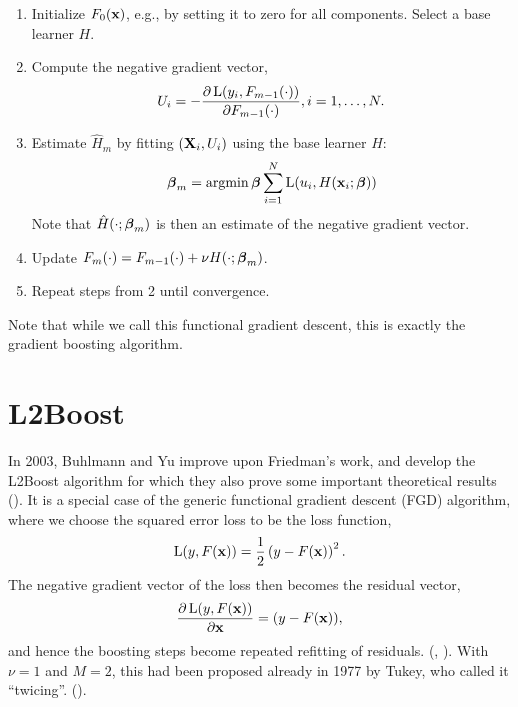 \begin{enumerate}
    \item Initialize $F_0(\mathbf{x})$, e.g., by setting it to zero for all components. Select a base learner $H$.
    \item Compute the negative gradient vector,
        \begin{equation}
            U_i=-\frac{\partial \operatorname{L}(y_i,F_{m-1}(\cdot))}{\partial F_{m-1}(\cdot)}, i=1,\dotsc,N.
        \end{equation}
    \item Estimate $\hat{H}_m$ by fitting $(\mathbf{X}_i,U_i)$ using the base learner $H$:
        \begin{equation}
            \boldsymbol{\beta}_m=\operatorname*{argmin}{\boldsymbol{\beta}}\sum_{i=1}^N\operatorname{L}(u_i,H(\mathbf{x}_i;\boldsymbol{\beta}))
        \end{equation}
        Note that $\hat{H}(\cdot;\boldsymbol{\beta}_m)$ is then an estimate of the negative gradient vector.
    \item Update $F_m(\cdot)=F_{m-1}(\cdot)+\nu H(\cdot;\boldsymbol{\beta}_m)$.
    \item Repeat steps from 2 until convergence.
\end{enumerate}
Note that while we call this functional gradient descent, this is exactly the gradient boosting algorithm.
\section{L2Boost}
In 2003, Buhlmann and Yu improve upon Friedman's work, and develop the L2Boost algorithm for which they also prove some important theoretical results (\cite{buhlmann-yu}). It is a special case of the generic functional gradient descent (FGD) algorithm, where we choose the squared error loss to be the loss function,
\begin{equation}
    \operatorname{L}(y,F(\mathbf{x}))=\frac{1}{2}\left(y-F(\mathbf{x})\right)^2.
\end{equation}
The negative gradient vector of the loss then becomes the residual vector,
\begin{equation}
    \frac{\partial\operatorname{L}(y,F(\mathbf{x}))}{\partial\mathbf{x}}=(y-F(\mathbf{x})),
\end{equation}
and hence the boosting steps become repeated refitting of residuals. (\cite{friedman2001}, \cite{buhlmann-yu}). With $\nu=1$ and $M=2$, this had been proposed already in 1977 by Tukey, who called it ``twicing''. (\cite{tukey}).
